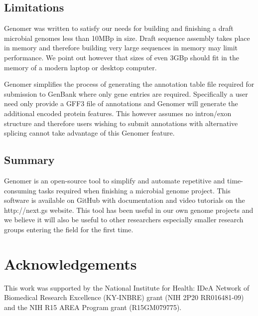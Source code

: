 \documentclass[10pt]{article}
\begin{document}
\subsection*{Limitations}

Genomer was written to satisfy our needs for building and finishing a draft
microbial genomes less than 10MBp in size. Draft sequence assembly takes place
in memory and therefore building very large sequences in memory may limit
performance. We point out however that sizes of even 3GBp should fit in the
memory of a modern laptop or desktop computer.

Genomer simplifies the process of generating the annotation table file required
for submission to GenBank where only gene entries are required. Specifically a
user need only provide a GFF3 file of annotations and Genomer will generate the
additional encoded protein features. This however assumes no intron/exon
structure and therefore users wishing to submit annotations with alternative
splicing cannot take advantage of this Genomer feature.

\subsection*{Summary}

Genomer is an open-source tool to simplify and automate repetitive and
time-consuming tasks required when finishing a microbial genome project. This
software is available on GitHub \cite{genomer-github} with documentation and
video tutorials on the http://next.gs website. This tool has been useful in our
own genome projects and we believe it will also be useful to other researchers
especially smaller research groups entering the field for the first time.

\section*{Acknowledgements}

This work was supported by the National Institute for Health: IDeA Network of
Biomedical Research Excellence (KY-INBRE) grant (NIH 2P20 RR016481-09) and the
NIH R15 AREA Program grant (R15GM079775).


\end{document}
